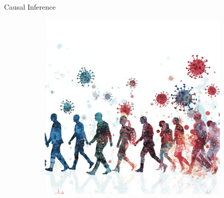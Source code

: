 \documentclass[aspectratio=169]{beamer}
\begin{document}
\begin{frame}{Causal Inference}
{\begin{figure}
\begin{subfigure}{0.3 \textwidth}
			\includegraphics[scale=0.1, valign=m]{imgs/infectious.png}
		\end{subfigure}
	\end{figure}

}
\end{frame}
\end{document}
